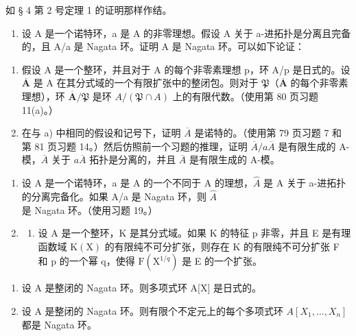 如 § 4 第 2 号定理 1 的证明那样作结。

\begin{enumerate}
\def\labelenumi{\arabic{enumi})}
\setcounter{enumi}{18}
\tightlist
\item
  设 A 是一个诺特环，a 是 A 的非零理想。假设 A 关于 a-进拓扑是分离且完备的，且 A/a 是 Nagata 环。证明 A 是 Nagata 环。可以如下论证：
\end{enumerate}

\begin{enumerate}
\def\labelenumi{\alph{enumi})}
\item
  假设 A 是一个整环，并且对于 A 的每个非零素理想 p，环 A/p 是日式的。设 \(\overline{\mathbf{A}}\) 是 A 在其分式域的一个有限扩张中的整闭包。则对于 \(\mathfrak{P}\)（\(\overline{\mathbf{A}}\) 的每个非零素理想），环 \(\overline{\mathbf{A}}/\mathfrak{P}\) 是环 \(A/(\mathfrak{P} \cap A)\) 上的有限代数。（使用第 80 页习题 11(a)。）
\item
  在与 a) 中相同的假设和记号下，证明 \(\overline{A}\) 是诺特的。（使用第 79 页习题 7 和第 81 页习题 14。）然后仿照前一个习题的推理，证明 \(\overline{A}/a\overline{A}\) 是有限生成的 A-模，\(\overline{A}\) 关于 \(a\overline{A}\) 拓扑是分离的，并且 \(\overline{A}\) 是有限生成的 A-模。
\end{enumerate}

\begin{enumerate}
\def\labelenumi{\arabic{enumi})}
\setcounter{enumi}{19}
\item
  设 A 是一个诺特环，a 是 A 的一个不同于 A 的理想，\(\hat{A}\) 是 A 关于 a-进拓扑的分离完备化。如果 A/a 是 Nagata 环，则 \(\hat{A}\) 是 Nagata 环。（使用习题 19。）
\item
  \begin{enumerate}
  \def\labelenumii{\alph{enumii})}
  \tightlist
  \item
    设 A 是一个整环，K 是其分式域。如果 K 的特征 p 非零，并且 E 是有理函数域 \(\mathrm{K}(\mathrm{X})\) 的有限纯不可分扩张，则存在 K 的有限纯不可分扩张 F 和 p 的一个幂 q，使得 \(\mathrm{F}(\mathrm{X}^{1/q})\) 是 E 的一个扩张。
  \end{enumerate}
\end{enumerate}

\begin{enumerate}
\def\labelenumi{\alph{enumi})}
\setcounter{enumi}{1}
\item
  设 A 是整闭的 Nagata 环。则多项式环 A{[}X{]} 是日式的。
\item
  设 A 是整闭的 Nagata 环。则有限个不定元上的每个多项式环 \(A[X_1, \ldots, X_n]\) 都是 Nagata 环。
\end{enumerate}

